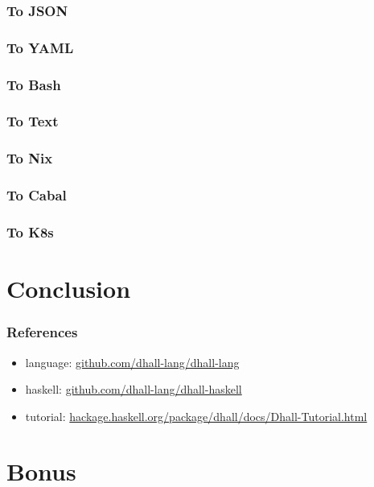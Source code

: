 \documentclass{beamer}
\begin{document}
 \begin{frame}
   \frametitle{To JSON}
 \end{frame}

 \begin{frame}
   \frametitle{To YAML}
 \end{frame}

 \begin{frame}
   \frametitle{To Bash}
 \end{frame}

 \begin{frame}
   \frametitle{To Text}
 \end{frame}

 \begin{frame}
   \frametitle{To Nix}
 \end{frame}

 \begin{frame}
   \frametitle{To Cabal}
 \end{frame}

 \begin{frame}
   \frametitle{To K8s}
 \end{frame}

 \section{Conclusion}

 \begin{frame}
   \frametitle{References}
   \begin{itemize}
   \item language: \url{github.com/dhall-lang/dhall-lang}
   \item haskell: \url{github.com/dhall-lang/dhall-haskell}
   \item tutorial: \url{hackage.haskell.org/package/dhall/docs/Dhall-Tutorial.html}
   \end{itemize}
 \end{frame}

\appendix{}

\section*{Bonus}\label{sec:bonus}
\end{document}
